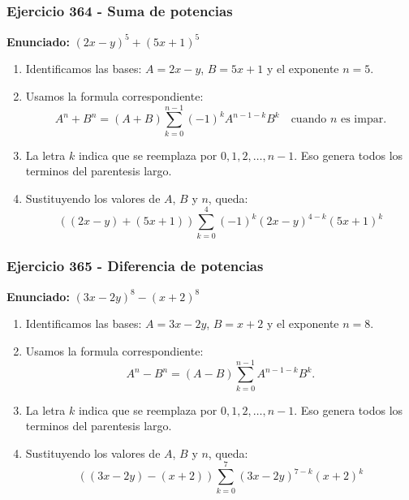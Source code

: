 \documentclass[11pt,a4paper]{article}
\begin{document}
\subsubsection*{Ejercicio 364 - Suma de potencias}
\textbf{Enunciado:} $ \left(2 x - y\right)^{5}+\left(5 x + 1\right)^{5} $\par
\begin{enumerate}[leftmargin=2em]
\item Identificamos las bases: \(A=2 x - y\), \(B=5 x + 1\) y el exponente \(n=5\).
\item Usamos la formula correspondiente: \[A^n+B^n=(A+B)\sum_{k=0}^{n-1}(-1)^kA^{n-1-k}B^k\quad\text{cuando }n\text{ es impar}.\]
\item La letra \(k\) indica que se reemplaza por \(0,1,2,\ldots,n-1\). Eso genera todos los terminos del parentesis largo.
\item Sustituyendo los valores de \(A\), \(B\) y \(n\), queda: \[\boxed{\left(\left(2 x - y\right)+\left(5 x + 1\right)\right)\sum_{k=0}^{4}(-1)^k\left(2 x - y\right)^{4-k}\left(5 x + 1\right)^k}\]
\end{enumerate}

\vspace{0.2cm}
\subsubsection*{Ejercicio 365 - Diferencia de potencias}
\textbf{Enunciado:} $ \left(3 x - 2 y\right)^{8}-\left(x + 2\right)^{8} $\par
\begin{enumerate}[leftmargin=2em]
\item Identificamos las bases: \(A=3 x - 2 y\), \(B=x + 2\) y el exponente \(n=8\).
\item Usamos la formula correspondiente: \[A^n-B^n=(A-B)\sum_{k=0}^{n-1}A^{n-1-k}B^k.\]
\item La letra \(k\) indica que se reemplaza por \(0,1,2,\ldots,n-1\). Eso genera todos los terminos del parentesis largo.
\item Sustituyendo los valores de \(A\), \(B\) y \(n\), queda: \[\boxed{\left(\left(3 x - 2 y\right)-\left(x + 2\right)\right)\sum_{k=0}^{7}\left(3 x - 2 y\right)^{7-k}\left(x + 2\right)^k}\]
\end{enumerate}

\vspace{0.2cm}
\end{document}
